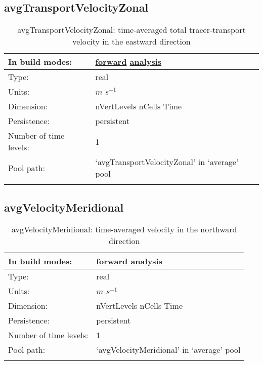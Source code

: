 \subsection[avgTransportVelocityZonal]{avgTransportVelocityZonal}
\label{subsec:var_sec_average_avgTransportVelocityZonal}
\begin{center}
\begin{longtable}{| p{2.0in} | p{4.0in} |}
        \hline 
        In build modes: & \hyperref[subsec:forward_var_tab_average]{forward} \hyperref[subsec:analysis_var_tab_average]{analysis} \\
        \hline 
        Type: & real \\
        \hline 
        Units: & $m$ $s^{-1}$ \\
        \hline 
        Dimension: & nVertLevels nCells Time \\
        \hline 
        Persistence: & persistent \\
        \hline 
        Number of time levels: & 1 \\
        \hline 
            Pool path: & `avgTransportVelocityZonal' in `average' pool \\
		 \hline 
    \caption{avgTransportVelocityZonal: time-averaged total tracer-transport velocity in the eastward direction}
\end{longtable}
\end{center}
\subsection[avgVelocityMeridional]{avgVelocityMeridional}
\label{subsec:var_sec_average_avgVelocityMeridional}
\begin{center}
\begin{longtable}{| p{2.0in} | p{4.0in} |}
        \hline 
        In build modes: & \hyperref[subsec:forward_var_tab_average]{forward} \hyperref[subsec:analysis_var_tab_average]{analysis} \\
        \hline 
        Type: & real \\
        \hline 
        Units: & $m$ $s^{-1}$ \\
        \hline 
        Dimension: & nVertLevels nCells Time \\
        \hline 
        Persistence: & persistent \\
        \hline 
        Number of time levels: & 1 \\
        \hline 
            Pool path: & `avgVelocityMeridional' in `average' pool \\
		 \hline 
    \caption{avgVelocityMeridional: time-averaged velocity in the northward direction}
\end{longtable}
\end{center}
